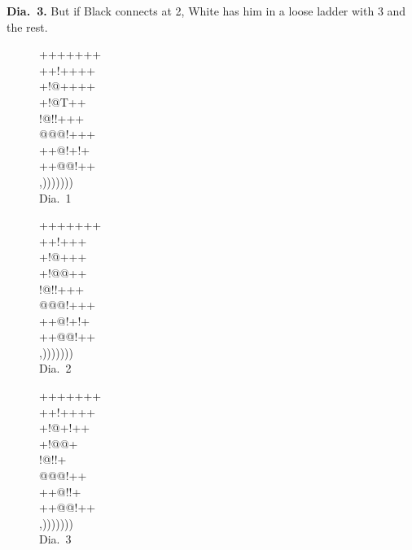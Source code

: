 \documentclass[mcrownvopaper,10pt,twopage,onecolumn,draft,showtrims]{memoir}
\begin{document}
\noindent
\textbf{Dia.\ 3.} But if Black connects at 2, White has him in a loose ladder with
3 and the rest.

\begin{figure}[ht]
    \begin{minipage}[c]{0.33\linewidth}
        \centering    
        {\gnos%
        +++++++\\
        ++!++++\\
        +!@++++\\
        +!@T++\\
        !@!!+++\\
        @@@!+++\\
        ++@!+!+\\
        ++@@!++\\
        ,)))))))\\
        }
        Dia.\ 1
    \end{minipage}%
    \begin{minipage}[c]{0.33\linewidth}
        \centering    
        {\gnos%
        +++++++\\
        ++!+++\\
        +!@+{\gnosw{}}++\\
        +!@@++\\
        !@!!+++\\
        @@@!+++\\
        ++@!+!+\\
        ++@@!++\\
        ,)))))))\\
        }
        Dia.\ 2
    \end{minipage}%
    \begin{minipage}[c]{0.33\linewidth}
        \centering    
        {\gnos%
        +++++++\\
        ++!++++\\
        +!@+!++\\
        +!@{\gnosb{}}@{\gnosw{}}+\\
        !@!!{\gnosb{}}{\gnosw{}}+\\
        @@@!{\gnosb{}}++\\
        ++@!{\gnosw{}}!+\\
        ++@@!++\\
        ,)))))))\\
        }
        Dia.\ 3
    \end{minipage}
\end{figure}
\end{document}
